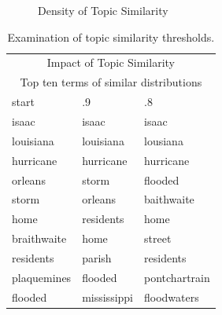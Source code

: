 \documentclass[10pt,twocolumn]{article}
\begin{document}
\begin{figure}[htp] 
\caption{Density of Topic Similarity}
\end{figure}  


\begin{table}
\begin{center}
\begin{tabular}{|l|l|l|}
  \hline
  \multicolumn{3}{|c|}{Impact of Topic Similarity} \\
  \multicolumn{3}{|c|}{Top ten terms of similar distributions} \\
  \hline
start & .9 & .8 \\
\hline
isaac & isaac & isaac \\
louisiana & louisiana & lousiana \\
hurricane & hurricane & hurricane \\
orleans & storm &  flooded \\
storm & orleans & baithwaite \\
home & residents & home \\
braithwaite & home & street \\
residents & parish & residents \\
plaquemines & flooded & pontchartrain \\
flooded & mississippi & floodwaters \\
  \hline
\end{tabular}
\caption*{Examination of topic similarity thresholds.}
\end{center}
\end{table}
\end{document}
